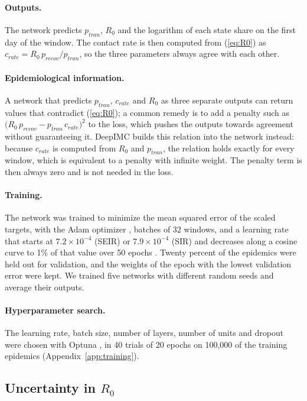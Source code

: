 \documentclass[12pt]{article}
\begin{document}
\paragraph{Outputs.} The network predicts $p_{tran}$, $R_0$ and the logarithm of each state share on
the first day of the window. The contact rate is then computed from (\ref{eq:R0}) as $c_{rate} = R_0
\, p_{recov}/p_{tran}$, so the three parameters always agree with each other.

\paragraph{Epidemiological information.} A network that predicts $p_{tran}$, $c_{rate}$ and $R_0$ as three
separate outputs can return values that contradict (\ref{eq:R0}); a common remedy is to add a penalty such
as $\big(R_0\,p_{recov} - p_{tran}\,c_{rate}\big)^2$ to the loss, which pushes the outputs towards agreement
without guaranteeing it. DeepIMC builds this relation into the network instead: because $c_{rate}$ is
computed from $R_0$ and $p_{tran}$, the relation holds exactly for every window, which is equivalent to a
penalty with infinite weight. The penalty term is then always zero and is not needed in the loss.

\paragraph{Training.} The network was trained to minimize the mean squared error of the scaled
targets, with the Adam optimizer \autocite{kingma2015adam}, batches of 32 windows, and a learning rate
that starts at $7.2 \times 10^{-4}$ (SEIR) or $7.9 \times 10^{-4}$ (SIR) and decreases along a cosine
curve to 1\% of that value over 50 epochs \autocite{loshchilov2017sgdr}. Twenty percent of the
epidemics were held out for validation, and the weights of the epoch with the lowest validation
error were kept. We trained five networks with different random seeds and average their outputs.

\paragraph{Hyperparameter search.} The learning rate, batch size, number of layers, number of units and
dropout were chosen with Optuna \autocite{akiba2019optuna}, in 40 trials of 20 epochs on 100,000 of
the training epidemics (Appendix~\ref{app:training}).

\subsection{Uncertainty in $R_0$}\label{sec:range}
\end{document}
